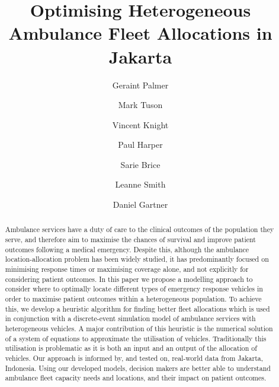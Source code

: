 \documentclass[preprint,12pt]{elsarticle}
\begin{document}
\begin{frontmatter}


\title{Optimising Heterogeneous Ambulance Fleet Allocations in Jakarta}

\author[inst1]{Geraint Palmer}
\author[inst1]{Mark Tuson}
\author[inst1]{Vincent Knight}
\author[inst1]{Paul Harper}
\author[inst1]{Sarie Brice}
\author[inst2]{Leanne Smith}
\author[inst1,inst3]{Daniel Gartner}


            



 \begin{abstract}
 Ambulance services have a duty of care to the clinical outcomes of the
 population they serve, and therefore aim to maximise the chances of survival
 and improve patient outcomes following a medical emergency. Despite this,
 although the ambulance location-allocation problem has been widely studied,
 it has predominantly focused on minimising response times or maximising
 coverage alone, and not explicitly for considering patient outcomes. In this
 paper we propose a modelling approach to consider where to optimally locate
 different types of emergency response vehicles in order to maximise patient
 outcomes within a heterogeneous population. To achieve this, we develop a
 heuristic algorithm for finding better fleet allocations which is used in
 conjunction with a discrete-event simulation model of ambulance services with
 heterogeneous vehicles. A major contribution of this heuristic is the numerical
 solution of a system of equations to approximate the utilisation of
 vehicles. Traditionally this utilisation is problematic as it is both an input
 and an output of the allocation of vehicles. Our approach is informed by, and
 tested on, real-world data from Jakarta, Indonesia. Using our developed models,
 decision makers are better able to understand ambulance fleet capacity needs
 and locations, and their impact on patient outcomes.


\end{abstract}
\end{frontmatter}
\end{document}
